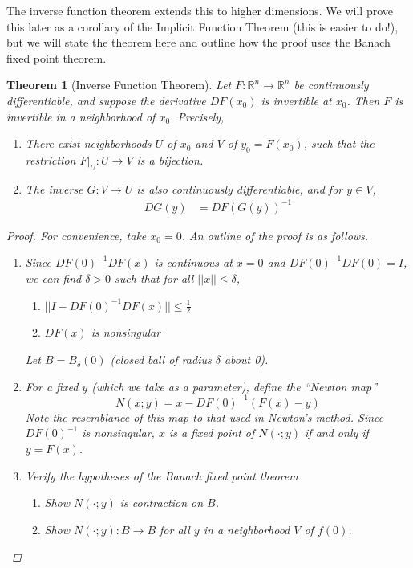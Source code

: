 \documentclass[10pt]{article}         %
\newtheorem{theorem}{Theorem}[section]
\theoremstyle{remark}
\newcommand{\R}{\mathbb{R}}
\begin{document}
The inverse function theorem extends this to higher dimensions. We will prove this later as a corollary of the Implicit Function Theorem (this is easier to do!), but we will state the theorem here and outline how the proof uses the Banach fixed point theorem.

\begin{theorem}[Inverse Function Theorem]
Let $F: \R^n \rightarrow \R^n$ be continuously differentiable, and suppose the derivative $DF(x_0)$ is invertible at $x_0$. Then $F$ is invertible in a neighborhood of $x_0$. Precisely,

\begin{enumerate}
\item There exist neighborhoods $U$ of $x_0$ and $V$ of $y_0 = F(x_0)$, such that the restriction $F|_U: U \rightarrow V$ is a bijection.
\item The inverse $G: V \rightarrow U$ is also continuously differentiable, and for $y \in V$,
\begin{align}
DG(y) &= DF(G(y))^{-1}
\end{align}
\end{enumerate}
\begin{proof}
For convenience, take $x_0 = 0$. An outline of the proof is as follows.
\begin{enumerate}
    \item Since $DF(0)^{-1} DF(x)$ is continuous at $x = 0$ and $DF(0)^{-1} DF(0) = I$, we can find $\delta > 0$ such that for all $||x|| \leq \delta$,
    \begin{enumerate}
    \item $||I - DF(0)^{-1} DF(x)|| \leq \frac{1}{2}$
    \item $DF(x)$ is nonsingular
    \end{enumerate}
    Let $B = \overline{ B_\delta(0) }$ (closed ball of radius $\delta$ about 0).

    \item For a fixed $y$ (which we take as a parameter), define the ``Newton map'' 
    \begin{equation*}
    N(x; y) = x - DF(0)^{-1}(F(x) - y)
    \end{equation*}
    Note the resemblance of this map to that used in Newton's method. Since $DF(0)^{-1}$ is nonsingular, $x$ is a fixed point of $N(\cdot; y)$ if and only if $y = F(x)$.

    \item Verify the hypotheses of the Banach fixed point theorem
    \begin{enumerate}
    \item Show $N(\cdot; y)$ is contraction on $B$.
    \item Show $N(\cdot; y): B \rightarrow B$ for all $y$ in a neighborhood $V$ of $f(0)$.
    \end{enumerate}
    

\end{enumerate}
\end{proof}
\end{theorem}
\end{document}
